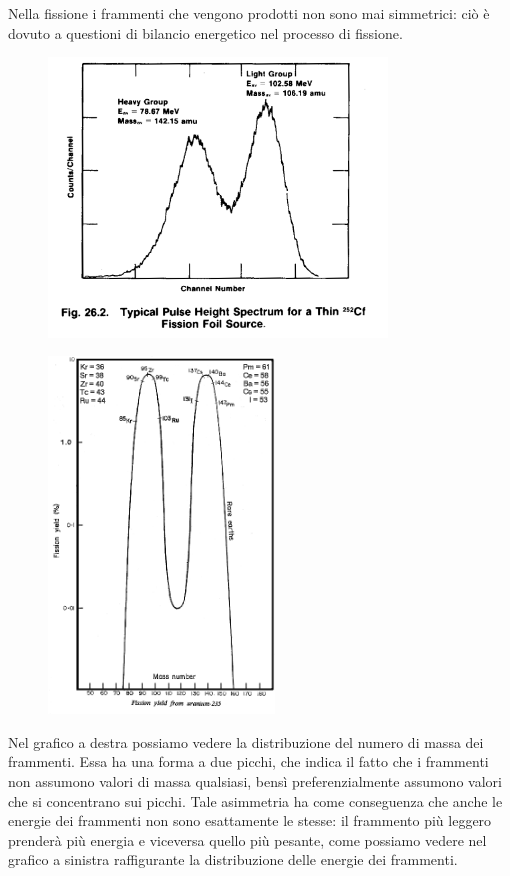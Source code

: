 Nella fissione i frammenti che vengono prodotti non sono mai simmetrici: ciò è dovuto a questioni di bilancio energetico nel processo di fissione.

\begin{minipage}{0.58\textwidth}
    \begin{figure}[H]
        \includegraphics[width=9cm]{immagini/Sorgenti_di_fissione_1.png}
    \end{figure}
\end{minipage}
\begin{minipage}{0.42\textwidth}
    \begin{figure}[H]
        \includegraphics[width=6cm]{immagini/Sorgenti_di_fissione_2.png}
    \end{figure}
\end{minipage}

\vspace{0.3cm}Nel grafico a destra possiamo vedere la distribuzione del numero di massa dei frammenti. Essa ha una forma a due picchi, che indica il fatto che i frammenti non assumono valori di massa qualsiasi, bensì preferenzialmente assumono valori che si concentrano sui picchi. Tale asimmetria ha come conseguenza che anche le energie dei frammenti non sono esattamente le stesse: il frammento più leggero prenderà più energia e viceversa quello più pesante, come possiamo vedere nel grafico a sinistra raffigurante la distribuzione delle energie dei frammenti.

